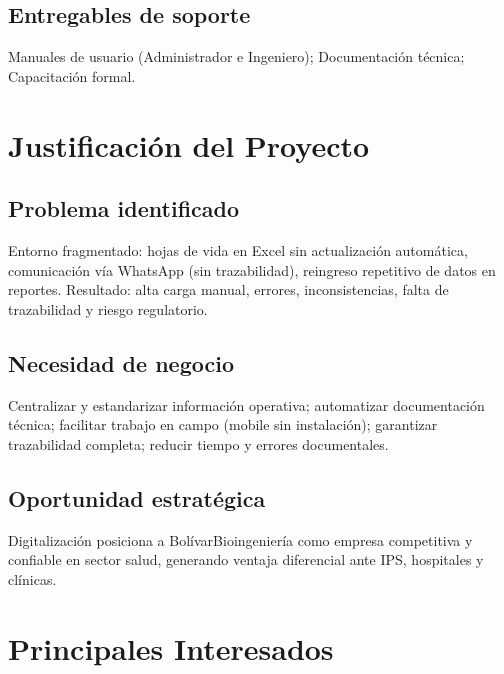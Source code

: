 \documentclass[12pt,a4paper]{article}
\begin{document}
\subsection{Entregables de soporte}

Manuales de usuario (Administrador e Ingeniero); Documentación técnica; Capacitación formal.

\section{Justificación del Proyecto}

\subsection{Problema identificado}

Entorno fragmentado: hojas de vida en Excel sin actualización automática, comunicación vía WhatsApp (sin trazabilidad), reingreso repetitivo de datos en reportes. Resultado: alta carga manual, errores, inconsistencias, falta de trazabilidad y riesgo regulatorio.

\subsection{Necesidad de negocio}

Centralizar y estandarizar información operativa; automatizar documentación técnica; facilitar trabajo en campo (mobile sin instalación); garantizar trazabilidad completa; reducir tiempo y errores documentales.

\subsection{Oportunidad estratégica}

Digitalización posiciona a BolívarBioingeniería como empresa competitiva y confiable en sector salud, generando ventaja diferencial ante IPS, hospitales y clínicas.

\section{Principales Interesados}
\end{document}
